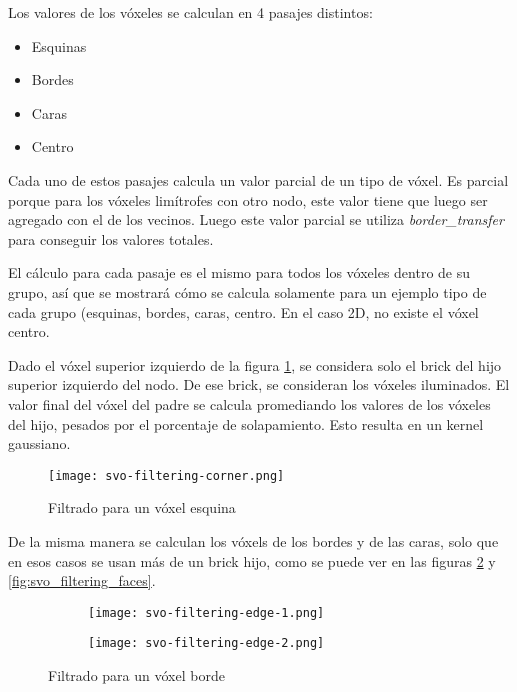 Los valores de los vóxeles se calculan en 4 pasajes distintos:
\begin{itemize}
    \item Esquinas
    \item Bordes
    \item Caras
    \item Centro
\end{itemize}

Cada uno de estos pasajes calcula un valor parcial de un tipo de vóxel.
Es parcial porque para los vóxeles limítrofes con otro nodo, este valor tiene que luego ser agregado con el de los vecinos.
Luego este valor parcial se utiliza \textit{border\_transfer} para conseguir los valores totales.

El cálculo para cada pasaje es el mismo para todos los vóxeles dentro de su grupo, así que se mostrará cómo se calcula solamente para un ejemplo tipo de cada grupo (esquinas, bordes, caras, centro.
En el caso 2D, no existe el vóxel centro.

Dado el vóxel superior izquierdo de la figura \ref{fig:svo_filtering_corners}, se considera solo el brick del hijo superior izquierdo del nodo.
De ese brick, se consideran los vóxeles iluminados.
El valor final del vóxel del padre se calcula promediando los valores de los vóxeles del hijo, pesados por el porcentaje de solapamiento.
Esto resulta en un kernel gaussiano. %

\begin{figure}
    \centering
    \texttt{[image: svo-filtering-corner.png]}
    \caption{Filtrado para un vóxel esquina}
    \label{fig:svo_filtering_corners}
\end{figure}

De la misma manera se calculan los vóxels de los bordes y de las caras, solo que en esos casos se usan más de un brick hijo, como se puede ver en las figuras \ref{fig:svo_filtering_edges} y \ref{fig:svo_filtering_faces}.

\begin{figure}
    \begin{center}
        \begin{subfigure}{.49\textwidth}
            \texttt{[image: svo-filtering-edge-1.png]}
        \end{subfigure}
        \begin{subfigure}{.49\textwidth}
            \texttt{[image: svo-filtering-edge-2.png]}
        \end{subfigure}
    \end{center}
    \caption{Filtrado para un vóxel borde}
    \label{fig:svo_filtering_edges}
\end{figure}

